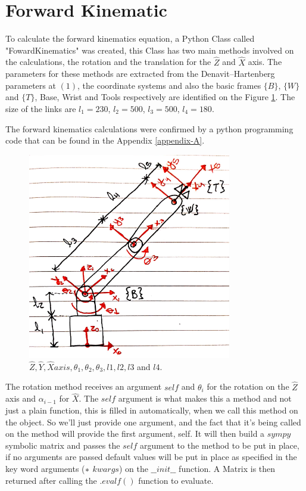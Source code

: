 \documentclass[transmag]{IEEEtran}
\begin{document}
\section{Forward Kinematic}


To calculate the forward kinematics equation, a Python Class called "FowardKinematics" was created, this Class has two main methods involved on the calculations, the rotation and the translation for the $\hat Z$ and $\hat X$ axis. The parameters for these methods are extracted from the Denavit–Hartenberg parameters at $(1)$, the coordinate systems and also the basic frames $\{B\}$, $\{W\}$ and $\{T\}$, Base, Wrist and Tools respectively are identified on the Figure \ref{Axis}. The size of the links are $l_1 = 230$, $l_2 = 500$, $l_3 = 500$, $l_4 = 180$.

The forward kinematics calculations were confirmed by a python programming code that can be found in the Appendix \ref{appendix-A}. 

\begin{figure}
\centerline{\includegraphics[width=3.5in]{./images/Axis}}
\caption{$\hat Z, \hat Y, \hat X axis, \theta_1, \theta_2, \theta_3, l1, l2, l3$ and $l4$.\label{Axis}}
\end{figure}

The rotation method receives an argument $self$ and $\theta_i$ for the rotation on the $\hat Z$ axis and $\alpha_{i-1}$ for $\hat X$. The $self$ argument is what makes this a method and not just a plain function, this is filled in automatically, when we call this method on the object. So we'll just provide one argument, and the fact that it's being called on the method will provide the first argument, self. It will then build a $sympy$ symbolic matrix and passes the $self$ argument to the method to be put in place, if no arguments are passed default values will be put in place as specified in the key word arguments ($\**$ $kwargs$) on the $\_\_init\_\_$ function. A Matrix is then returned after calling the $.evalf()$ function to evaluate.
\end{document}
